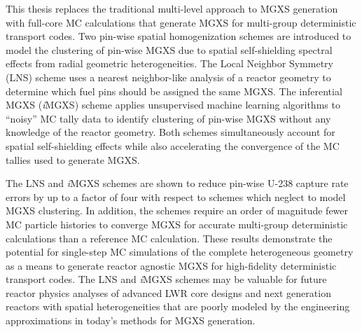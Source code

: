 \begin{abstractpage}

This thesis replaces the traditional multi-level approach to MGXS generation with full-core MC calculations that generate MGXS for multi-group deterministic transport codes. Two pin-wise spatial homogenization schemes are introduced to model the clustering of pin-wise MGXS due to spatial self-shielding spectral effects from radial geometric heterogeneities. The Local Neighbor Symmetry (LNS) scheme uses a nearest neighbor-like analysis of a reactor geometry to determine which fuel pins should be assigned the same MGXS. The inferential MGXS (\textit{i}MGXS) scheme applies unsupervised machine learning algorithms to ``noisy'' MC tally data to identify clustering of pin-wise MGXS without any knowledge of the reactor geometry. Both schemes simultaneously account for spatial self-shielding effects while also accelerating the convergence of the MC tallies used to generate MGXS.




The LNS and \textit{i}MGXS schemes are shown to reduce pin-wise U-238 capture rate errors by up to a factor of four with respect to schemes which neglect to model MGXS clustering. In addition, the schemes require an order of magnitude fewer MC particle histories to converge MGXS for accurate multi-group deterministic calculations than a reference MC calculation. These results demonstrate the potential for single-step MC simulations of the complete heterogeneous geometry as a means to generate reactor agnostic MGXS for high-fidelity deterministic transport codes. The LNS and \textit{i}MGXS schemes may be valuable for future reactor physics analyses of advanced LWR core designs and next generation reactors with spatial heterogeneities that are poorly modeled by the engineering approximations in today's methods for MGXS generation.


\end{abstractpage}
